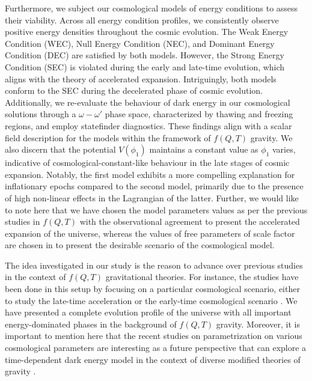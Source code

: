 \documentclass[aps,prd,showpacs,nofootinbib,floats,floatfix,preprintnumbers,groupedaddress,twocolumn]{revtex4-1}
\begin{document}
    Furthermore, we subject our cosmological models of energy conditions to assess their viability. Across all energy condition profiles, we consistently observe positive energy densities throughout the cosmic evolution. The Weak Energy Condition (WEC), Null Energy Condition (NEC), and Dominant Energy Condition (DEC) are satisfied by both models. However, the Strong Energy Condition (SEC) is violated during the early and late-time evolution, which aligns with the theory of accelerated expansion. Intriguingly, both models conform to the SEC during the decelerated phase of cosmic evolution. Additionally, we re-evaluate the behaviour of dark energy in our cosmological solutions through a $\omega-\omega'$ phase space, characterized by thawing and freezing regions, and employ statefinder diagnostics. These findings align with a scalar field description for the models within the framework of $f(Q,T)$ gravity. We also discern that the potential $V(\phi_1)$ maintains a constant value as $\phi_1$ varies, indicative of cosmological-constant-like behaviour in the late stages of cosmic expansion. Notably, the first model exhibits a more compelling explanation for inflationary epochs compared to the second model, primarily due to the presence of high non-linear effects in the Lagrangian of the latter. Further, we would like to note here that we have chosen the model parameters values as per the previous studies in $f(Q,T)$ with the observational agreement to present the accelerated expansion of the universe, whereas the values of free parameters of scale factor are chosen in to present the desirable scenario of the cosmological model.

    The idea investigated in our study is the reason to advance over previous studies in the context of $f(Q,T)$ gravitational theories. For instance, the studies have been done in this setup by focusing on a particular cosmological scenario, either to study the late-time acceleration \cite{Xu,Simran3,Simran2,gaurav} or the early-time cosmological scenario \cite{Maryam}. We have presented a complete evolution profile of the universe with all important energy-dominated phases in the background of $f(Q,T)$ gravity. Moreover, it is important to mention here that the recent studies on parametrization on various cosmological parameters are interesting as a future perspective that can explore a time-dependent dark energy model in the context of diverse modified theories of gravity \cite{G8,G9,G10,G11,G12,G13,G14,G15}.
\end{document}
